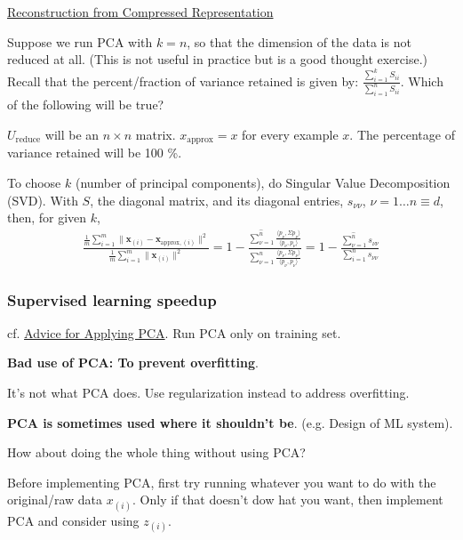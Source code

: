 \documentclass[10pt]{amsart}
\begin{document}
\begin{multicols*}{2}
\href{https://www.coursera.org/learn/machine-learning/lecture/X8JoQ/reconstruction-from-compressed-representation}{Reconstruction from Compressed Representation}  

Suppose we run PCA with $k=n$, so that the dimension of the data is not reduced at all.  (This is not useful in practice but is a good thought exercise.)  Recall that the percent/fraction of variance retained is given by: $\frac{ \sum_{i=1}^k S_{ii} }{ \sum_{i=1}^n S_{ii} }$.  Which of the following will be true?  

$U_{\text{reduce}} $ will be an $n\times n$ matrix.  $x_{\text{approx}} = x$ for every example $x$.  The percentage of variance retained will be 100 \%.  

To choose $k$ (number of principal components), do Singular Value Decomposition (SVD).  With $S$, the diagonal matrix, and its diagonal entries, $s_{\nu \nu}$, $\nu = 1\dots n\equiv d$, then, for given $k$, 
\[
\begin{gathered}
	\frac{ \frac{1}{m} \sum_{i=1}^m \| \mathbf{x}_{(i)} - \mathbf{x}_{\text{approx}, (i)} \|^2 }{ \frac{1}{m} \sum_{i=1}^m \| \mathbf{x}_{(i)} \|^2 } = 1- \frac{ \sum_{\nu =1}^{ \widehat{n} }  \frac{ \langle p_{\nu} , \Sigma p_{\nu}  \rangle }{ \langle p_{\nu} , p_{\nu} \rangle } }{ \sum_{\nu=1}^n \frac{ \langle p_{\nu} , \Sigma p_{\nu} \rangle }{ \langle p_{\nu}, p_{\nu} \rangle } } = 1 - \frac{ \sum_{\nu=1}^{\widehat{n} } s_{\nu \nu } }{ \sum_{i=1}^n s_{\nu \nu } }
\end{gathered}
\]

\subsubsection{Supervised learning speedup}  cf. \href{https://www.coursera.org/learn/machine-learning/lecture/RBqQl/advice-for-applying-pca}{Advice for Applying PCA}.   Run PCA only on training set.  


\textbf{Bad use of PCA: To prevent overfitting}.  

It's not what PCA does.  Use regularization instead to address overfitting.  

\textbf{PCA is sometimes used where it shouldn't be}.  (e.g. Design of ML system).  

How about doing the whole thing without using PCA?

Before implementing PCA, first try running whatever you want to do with the original/raw data $x_{(i)}$.  Only if that doesn't dow hat you want, then implement PCA and consider using $z_{(i)}$.  




\end{multicols*}
\end{document}
